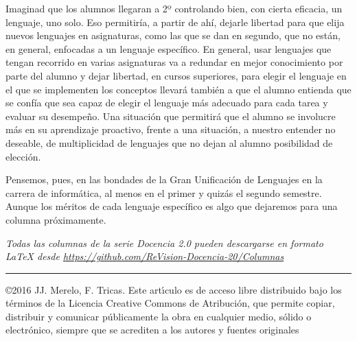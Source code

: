 \documentclass[twoside,10pt]{article}
\newcommand{\surl}[1]{{\small\url{#1}}}
\newcounter{vol}
\begin{document}
\begin{multicols}{2}
Imaginad que los alumnos llegaran a 2º controlando bien, con cierta
eficacia, un lenguaje, uno solo. Eso permitiría, a partir de ahí,
dejarle libertad para que elija nuevos lenguajes en asignaturas, como
las que se dan en segundo, que no están, en general, enfocadas a un lenguaje
específico. En general, usar lenguajes que tengan recorrido en varias
asignaturas va a redundar en mejor conocimiento por parte del alumno y
dejar libertad, en cursos superiores, para elegir el lenguaje en el
que se implementen los conceptos llevará también a que el alumno
entienda que se confía que sea capaz de elegir el lenguaje más
adecuado para cada tarea y evaluar su desempeño. Una situación que
permitirá que el alumno se involucre más en su aprendizaje proactivo,
frente a una situación, a nuestro entender no deseable, de
multiplicidad de lenguajes que no dejan al alumno posibilidad de elección.

Pensemos, pues, en las bondades de la Gran Unificación de Lenguajes en
la carrera de informática, al menos en el primer y quizás el segundo
semestre. Aunque los méritos de cada lenguaje 
específico es algo que dejaremos para una columna próximamente. 

\noindent  
\bigskip

\noindent\emph{Todas las columnas de la serie Docencia 2.0
pueden descargarse en formato LaTeX desde
\surl{https://github.com/ReVision-Docencia-20/Columnas}}

\noindent\rule{90mm}{1pt}

{\small \noindent\copyright 2016 JJ. Merelo, F. Tricas. Este art\'{\i}culo es de acceso libre distribuido bajo los t\'{e}rminos
de la Licencia Creative Commons de Atribuci\'{o}n, que permite copiar,
distribuir y comunicar p\'{u}blicamente la obra en cualquier medio, s\'{o}lido
o electr\'{o}nico, siempre que se acrediten a los autores y fuentes
originales}

\end{multicols}
\end{document}

